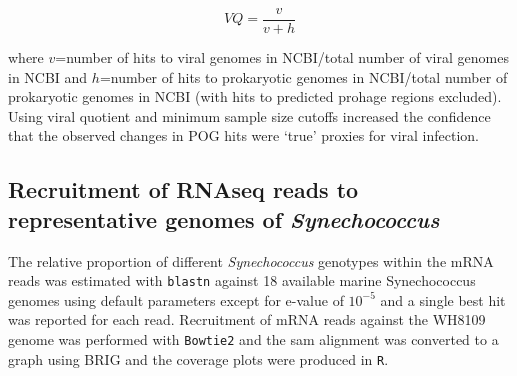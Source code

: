 \begin{equation}
VQ = \frac{v}{v+h}
\end{equation}

\noindent where $v$=number of hits to viral genomes in NCBI/total number of viral genomes in NCBI and $h$=number of hits to prokaryotic genomes in NCBI/total number of prokaryotic genomes in NCBI (with hits to predicted prohage regions excluded). Using viral quotient and minimum sample size cutoffs increased the confidence that the observed changes in POG hits were `true' proxies for viral infection.

\subsection{Recruitment of RNAseq reads to representative genomes of {\em Synechococcus}}

The relative proportion of different {\em Synechococcus} genotypes within the mRNA reads was estimated with {\tt blastn} \cite{schloss_introducing_2009} against 18 available marine Synechococcus genomes using default parameters except for e-value of $10^{−5}$ and a single best hit was reported for each read. Recruitment of mRNA reads against the WH8109 genome was performed with {\tt Bowtie2} \cite{langmead_fast_2012} and the sam alignment was converted to a graph using BRIG \cite{alikhan_blast_2011} and the coverage plots were produced in {\tt R}.